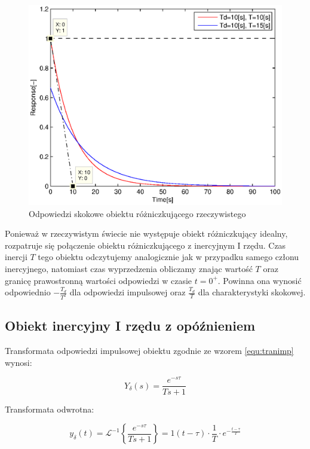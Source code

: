 \documentclass[12pt]{article}
\begin{document}
\begin{figure}[!htb]
	\begin{center}
		\includegraphics[width=14cm]{../res/img/step5.eps}
	\end{center}
	\caption{Odpowiedzi skokowe obiektu różniczkującego rzeczywistego}
\end{figure}

Ponieważ w rzeczywistym świecie nie występuje obiekt różniczkujący idealny,
rozpatruje się połączenie obiektu różniczkującego z inercyjnym I rzędu. Czas
inercji $T$ tego obiektu odczytujemy analogicznie jak w przypadku samego członu
inercyjnego, natomiast czas wyprzedzenia obliczamy znając wartość $T$ oraz
granicę prawostronną wartości odpowiedzi w czasie $t=0^{+}$. Powinna ona wynosić
odpowiednio $-\frac{T_d}{T^2}$ dla odpowiedzi impulsowej oraz $\frac{T_d}{T}$
dla charakterystyki skokowej.

\newpage

\subsection{Obiekt inercyjny I rzędu z opóźnieniem}

Transformata odpowiedzi impulsowej obiektu zgodnie ze wzorem \eqref{equ:tranimp}
wynosi:

\begin{equation*}
	Y_{\delta}(s)=\frac{e^{-s\tau}}{Ts+1}
\end{equation*}

Transformata odwrotna:

\begin{equation*}
	y_{\delta}(t)=\mathcal{L}^{-1}\left\{\frac{e^{-s\tau}}{Ts+1}\right\} =
	1(t-\tau)\cdot \frac{1}{T}\cdot e^{-\frac{t-\tau}{T}}
\end{equation*}
\end{document}
